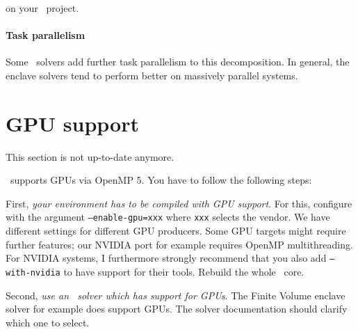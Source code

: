 \noindent
on your \ExaHyPE\ project. 


\paragraph{Task parallelism}

Some \ExaHyPE\ solvers add further task parallelism to this decomposition. 
In general, the enclave solvers tend to perform better on massively parallel
systems.


% 


\section{GPU support}


\begin{remark}
 This section is not up-to-date anymore.
\end{remark}


\ExaHyPE\ supports GPUs via OpenMP 5.
You have to follow the following steps:


First, \emph{your environment has to be compiled with GPU support}.
For this, configure with the argument \texttt{--enable-gpu=xxx} where
\texttt{xxx} selects the vendor.
We have different settings for different GPU producers.
Some GPU targets might require further features; our NVIDIA port for example
requires OpenMP multithreading.
For NVIDIA systems, I furthermore strongly
recommend that you also add \texttt{--with-nvidia} to have support for their tools.
Rebuild the whole \Peano\ core.


Second, \emph{use an \ExaHyPE\ solver which has support for GPUs}. 
The Finite Volume enclave solver for example does support GPUs. 
The solver documentation should clarify which one to select.


